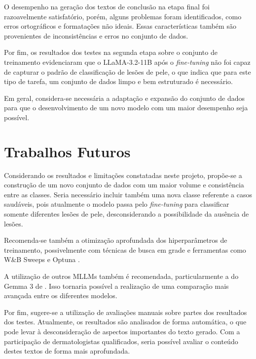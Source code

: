 O desempenho na geração dos textos de conclusão na etapa final foi razoavelmente satisfatório, porém, alguns problemas
foram identificados, como erros ortográficos e formatações não ideais. Essas características também são provenientes de
inconsistências e erros no conjunto de dados.

Por fim, os resultados dos testes na segunda etapa sobre o conjunto de treinamento evidenciaram que o
\ac{LLaMA}-3.2-11B após o \textit{fine-tuning} não foi capaz de capturar o padrão de classificação de lesões de pele,
o que indica que para este tipo de tarefa, um conjunto de dados limpo e bem estruturado é necessário.

Em geral, considera-se necessária a adaptação e expansão do conjunto de dados para que o desenvolvimento de um novo
modelo com um maior desempenho seja possível.

\section{Trabalhos Futuros}

Considerando os resultados e limitações constatadas neste projeto, propõe-se a construção de um novo conjunto de dados
com um maior volume e consistência entre as classes. Seria necessário incluir também uma nova classe referente a casos
saudáveis, pois atualmente o modelo passa pelo \textit{fine-tuning} para classificar somente diferentes lesões de pele,
desconsiderando a possibilidade da ausência de lesões.

Recomenda-se também a otimização aprofundada dos hiperparâmetros de treinamento, possivelmente com técnicas de busca em
grade e ferramentas como W\&B Sweeps e Optuna \cite{wab_sweeps, optuna_2019}.

A utilização de outros \acp{MLLM} também é recomendada, particularmente a do Gemma 3 de \textcite{team2025gemma}. Isso
tornaria possível a realização de uma comparação mais avançada entre os diferentes modelos.

Por fim, sugere-se a utilização de avaliações manuais sobre partes dos resultados dos testes. Atualmente, os resultados
são analisados de forma automática, o que pode levar à desconsideração de aspectos importantes do texto gerado. Com a
participação de dermatologistas qualificados, seria possível avaliar o conteúdo destes textos de forma mais
aprofundada.
